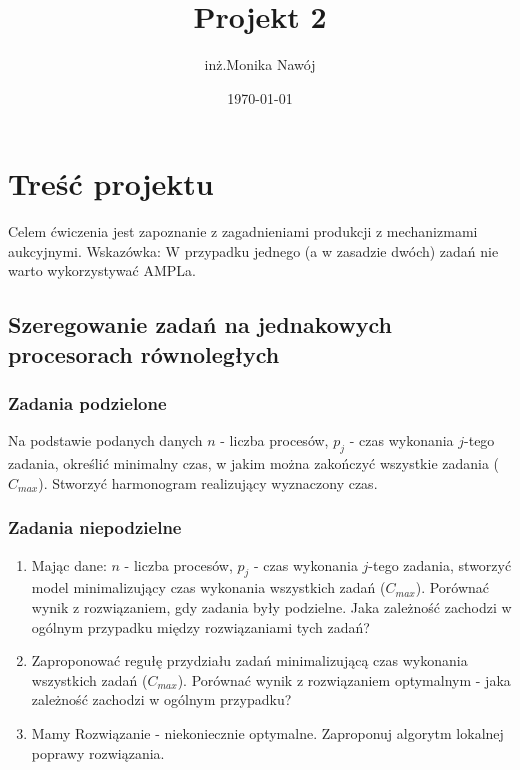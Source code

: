\documentclass[
    12pt, %
]{../fphw}
\title{Projekt 2} %
\author{inż.Monika Nawój} %
\date{\today} %
\institute{Politechnika Warszawska \\ Wydział Elektroniki i Technik Informacyjnych} %
\begin{document}
\maketitle %


\section{Treść projektu}
Celem ćwiczenia jest zapoznanie z zagadnieniami produkcji
z mechanizmami aukcyjnymi.
Wskazówka: W przypadku jednego (a w zasadzie dwóch) zadań nie warto
wykorzystywać AMPLa.
\subsection {Szeregowanie zadań na jednakowych procesorach równoległych}
\subsubsection{Zadania podzielone}
Na podstawie podanych danych \(n\) - liczba procesów,
\(p_j\) - czas wykonania \(j\)-tego zadania, określić minimalny czas,
w jakim można zakończyć wszystkie zadania (\(C_{max}\)).
Stworzyć harmonogram realizujący wyznaczony czas.

\subsubsection{Zadania niepodzielne}
\begin{enumerate}[label=(\alph*)]
    \item Mając dane: \(n\) - liczba procesów, \(p_j\) - czas wykonania
          \(j\)-tego zadania, stworzyć model minimalizujący czas wykonania
          wszystkich zadań (\(C_{max}\)). Porównać wynik z rozwiązaniem,
          gdy zadania były podzielne.
          Jaka zależność zachodzi w ogólnym przypadku między rozwiązaniami tych zadań?
    \item Zaproponować regułę przydziału zadań minimalizującą czas
          wykonania wszystkich zadań (\(C_{max}\)).
          Porównać wynik z rozwiązaniem optymalnym - jaka zależność zachodzi w ogólnym przypadku?
    \item  Mamy Rozwiązanie - niekoniecznie optymalne. Zaproponuj algorytm lokalnej poprawy rozwiązania.
\end{enumerate}
\end{document}
